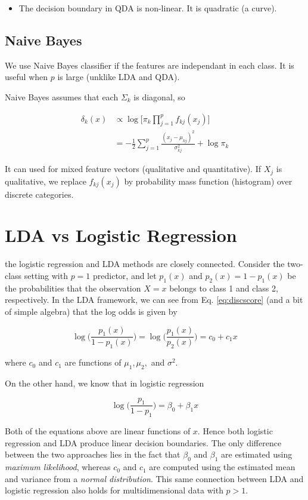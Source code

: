 \documentclass[]{book}
\newenvironment{rmdblock}[1]
  {\begin{shaded*}
  \begin{itemize}
  \renewcommand{\labelitemi}{
    \raisebox{-.7\height}[0pt][0pt]{
      {\setkeys{Gin}{width=2em,keepaspectratio}\texttt{[image: img/icons/\#1]}}
    }
  }
  \item
  }
  {
  \end{itemize}
  \end{shaded*}
  }
\newenvironment{rmdcaution}
  {\begin{rmdblock}{caution}}
  {\end{rmdblock}}
\begin{document}
\begin{rmdcaution}
The decision boundary in QDA is non-linear. It is quadratic (a curve).
\end{rmdcaution}

\subsection{Naive Bayes}\label{naive-bayes}

We use Naive Bayes classifier if the features are independant in each
class. It is useful when \(p\) is large (unklike LDA and QDA).

Naive Bayes assumes that each \(\Sigma_k\) is diagonal, so

\begin{align*}
\delta_k(x) &\propto \log \bigg[\pi_k \prod_{j=1}^p f_{kj}(x_j) \bigg] \\
            &= -\frac{1}{2} \sum_{j=1}^p \frac{(x_j-\mu_{kj})^2}{\sigma_{kj}^2} + \log \pi_k
\end{align*}

It can used for mixed feature vectors (qualitative and quantitative). If
\(X_j\) is qualitative, we replace \(f_{kj}(x_j)\) by probability mass
function (histogram) over discrete categories.

\section{LDA vs Logistic Regression}\label{lda-vs-logistic-regression}

the logistic regression and LDA methods are closely connected. Consider
the two-class setting with \(p =1\) predictor, and let \(p_1(x)\) and
\(p_2(x)=1−p_1(x)\) be the probabilities that the observation \(X = x\)
belongs to class 1 and class 2, respectively. In the LDA framework, we
can see from Eq. \eqref{eq:discscore} (and a bit of simple algebra) that
the log odds is given by

\[ \log \bigg(\frac{p_1(x)}{1-p_1(x)}\bigg) = \log \bigg(\frac{p_1(x)}{p_2(x)}\bigg) = c_0 + c_1 x\]

where \(c_0\) and \(c_1\) are functions of \(\mu_1, \mu_2,\) and
\(\sigma^2\).

On the other hand, we know that in logistic regression

\[ \log \bigg(\frac{p_1}{1-p_1}\bigg) = \beta_0 + \beta_1 x\]

Both of the equations above are linear functions of \(x\). Hence both
logistic regression and LDA produce linear decision boundaries. The only
diﬀerence between the two approaches lies in the fact that \(\beta_0\)
and \(\beta_1\) are estimated using \emph{maximum likelihood}, whereas
\(c_0\) and \(c_1\) are computed using the estimated mean and variance
from a \emph{normal distribution}. This same connection between LDA and
logistic regression also holds for multidimensional data with \(p> 1\).
\end{document}
